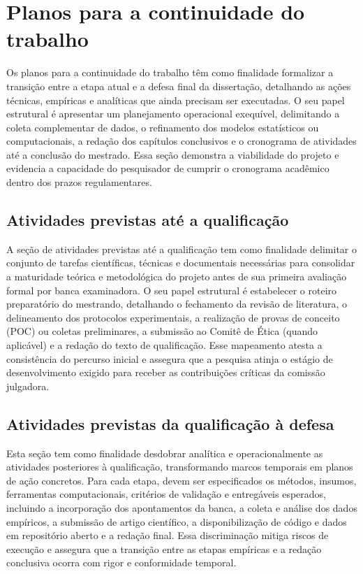 \chapter{Planos para a continuidade do trabalho}
\label{ch:plano_trabalho}
Os planos para a continuidade do trabalho têm como finalidade formalizar a transição entre a etapa atual e a defesa final da dissertação, detalhando as ações técnicas, empíricas e analíticas que ainda precisam ser executadas. O seu papel estrutural é apresentar um planejamento operacional exequível, delimitando a coleta complementar de dados, o refinamento dos modelos estatísticos ou computacionais, a redação dos capítulos conclusivos e o cronograma de atividades até a conclusão do mestrado. Essa seção demonstra a viabilidade do projeto e evidencia a capacidade do pesquisador de cumprir o cronograma acadêmico dentro dos prazos regulamentares.

\section{Atividades previstas até a qualificação}
\label{sec:atividades_ate_qualificacao}
A seção de atividades previstas até a qualificação tem como finalidade delimitar o conjunto de tarefas científicas, técnicas e documentais necessárias para consolidar a maturidade teórica e metodológica do projeto antes de sua primeira avaliação formal por banca examinadora. O seu papel estrutural é estabelecer o roteiro preparatório do mestrando, detalhando o fechamento da revisão de literatura, o delineamento dos protocolos experimentais, a realização de provas de conceito (POC) ou coletas preliminares, a submissão ao Comitê de Ética (quando aplicável) e a redação do texto de qualificação. Esse mapeamento atesta a consistência do percurso inicial e assegura que a pesquisa atinja o estágio de desenvolvimento exigido para receber as contribuições críticas da comissão julgadora.

\section{Atividades previstas da qualificação à defesa}
\label{sec:atividades_ate_defesa}
Esta seção tem como finalidade desdobrar analítica e operacionalmente as atividades posteriores à qualificação, transformando marcos temporais em planos de ação concretos. Para cada etapa, devem ser especificados os métodos, insumos, ferramentas computacionais, critérios de validação e entregáveis esperados, incluindo a incorporação dos apontamentos da banca, a coleta e análise dos dados empíricos, a submissão de artigo científico, a disponibilização de código e dados em repositório aberto e a redação final. Essa discriminação mitiga riscos de execução e assegura que a transição entre as etapas empíricas e a redação conclusiva ocorra com rigor e conformidade temporal.

